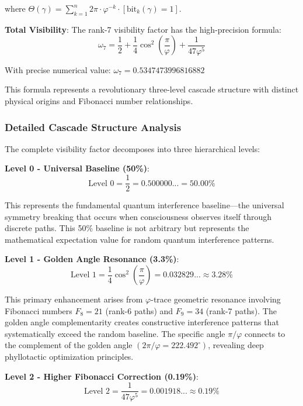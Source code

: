 \documentclass[%
 reprint,
 amsmath,amssymb,
 aps,
 prd,
 10pt,
 nofootinbib,      %
 longbibliography  %
]{revtex4-2}
\theoremstyle{definition}
\theoremstyle{remark}
\begin{document}
where $\Theta(\gamma) = \sum_{k=1}^n 2\pi \cdot \varphi^{-k} \cdot [\text{bit}_k(\gamma) = 1]$.

\textbf{Total Visibility}: The rank-7 visibility factor has the high-precision formula:
\begin{equation}
\boxed{\omega_7 = \frac{1}{2} + \frac{1}{4}\cos^2\left(\frac{\pi}{\varphi}\right) + \frac{1}{47\varphi^5}}
\end{equation}

With precise numerical value: $\omega_7 = 0.5347473996816882$

This formula represents a revolutionary three-level cascade structure with distinct physical origins and Fibonacci number relationships.

\subsubsection{Detailed Cascade Structure Analysis}

The complete visibility factor decomposes into three hierarchical levels:

\textbf{Level 0 - Universal Baseline (50\%)}:
\begin{equation}
\text{Level 0} = \frac{1}{2} = 0.500000... = 50.00\%
\end{equation}

This represents the fundamental quantum interference baseline—the universal symmetry breaking that occurs when consciousness observes itself through discrete paths. This 50\% baseline is not arbitrary but represents the mathematical expectation value for random quantum interference patterns.

\textbf{Level 1 - Golden Angle Resonance (3.3\%)}:
\begin{equation}
\text{Level 1} = \frac{1}{4}\cos^2\left(\frac{\pi}{\varphi}\right) = 0.032829... \approx 3.28\%
\end{equation}

This primary enhancement arises from $\varphi$-trace geometric resonance involving Fibonacci numbers $F_8 = 21$ (rank-6 paths) and $F_9 = 34$ (rank-7 paths). The golden angle complementarity creates constructive interference patterns that systematically exceed the random baseline. The specific angle $\pi/\varphi$ connects to the complement of the golden angle $(2\pi/\varphi = 222.492^\circ)$, revealing deep phyllotactic optimization principles.

\textbf{Level 2 - Higher Fibonacci Correction (0.19\%)}:
\begin{equation}
\text{Level 2} = \frac{1}{47\varphi^5} = 0.001918... \approx 0.19\%
\end{equation}
\end{document}
